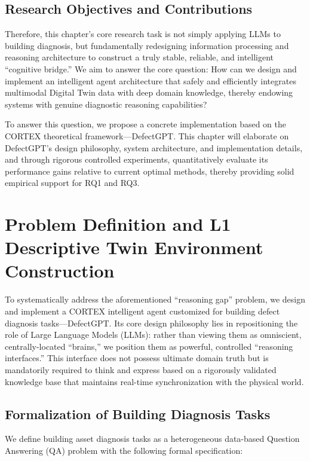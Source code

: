 \subsection{Research Objectives and Contributions}

Therefore, this chapter's core research task is not simply applying LLMs to building diagnosis, but fundamentally redesigning information processing and reasoning architecture to construct a truly stable, reliable, and intelligent ``cognitive bridge.'' We aim to answer the core question: How can we design and implement an intelligent agent architecture that safely and efficiently integrates multimodal Digital Twin data with deep domain knowledge, thereby endowing systems with genuine diagnostic reasoning capabilities?

To answer this question, we propose a concrete implementation based on the CORTEX theoretical framework—DefectGPT. This chapter will elaborate on DefectGPT's design philosophy, system architecture, and implementation details, and through rigorous controlled experiments, quantitatively evaluate its performance gains relative to current optimal methods, thereby providing solid empirical support for RQ1 and RQ3.

\section{Problem Definition and L1 Descriptive Twin Environment Construction}

To systematically address the aforementioned ``reasoning gap'' problem, we design and implement a CORTEX intelligent agent customized for building defect diagnosis tasks—DefectGPT. Its core design philosophy lies in repositioning the role of Large Language Models (LLMs): rather than viewing them as omniscient, centrally-located ``brains,'' we position them as powerful, controlled ``reasoning interfaces.'' This interface does not possess ultimate domain truth but is mandatorily required to think and express based on a rigorously validated knowledge base that maintains real-time synchronization with the physical world.

\subsection{Formalization of Building Diagnosis Tasks}

We define building asset diagnosis tasks as a heterogeneous data-based Question Answering (QA) problem with the following formal specification:

